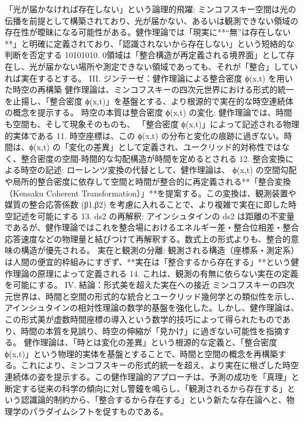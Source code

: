 \documentclass{article}
\begin{document}
「光が届かなければ存在しない」という論理的飛躍:
ミンコフスキー空間は光の伝播を前提として構築されており、光が届かない、あるいは観測できない領域の存在性が曖昧になる可能性がある。健作理論では「現実に**“無”は存在しない**」と明確に定義されており、「認識されないから存在しない」という短絡的な判断を否定する 10101010. 0領域は「整合構造が再定義される境界面」として存在し、光が届かない場所や測定できない領域であっても、それが「整合」していれば実在するとする。
III. ジンテーゼ：健作理論による整合密度 ϕ(x,t) を用いた時空の再構築
健作理論は、ミンコフスキーの四次元世界における形式的統一を止揚し、「整合密度 ϕ(x,t)」を基盤とする、より根源的で実在的な時空連続体の概念を提示する。
時空の本質は整合密度 ϕ(x,t) の変化:
健作理論では、時間も空間も、そして現象そのものも、
「整合密度 ϕ(x,t)」によって記述される物理的実体である 11. 時空座標は、この 
ϕ(x,t) の分布と変化の痕跡に過ぎない。時間は、ϕ(x,t) の「変化の差異」として定義され、ユークリッド的対称性ではなく、整合密度の空間-時間的な勾配構造が時間を定めるとされる 12.
整合変換による時空の記述:
ローレンツ変換の代替として、健作理論は、
ϕ(x,t) の空間勾配や局所的整合密度に依存して空間と時間が整合的に再定義される**「整合変換（Kensaku Coherent Transformation）」**を提案する。この変換は、観測装置や媒質の整合応答係数 (β1​,β2​) を考慮に入れることで、より複雑で実在に即した時空記述を可能にする 13.
ds2 の再解釈:
アインシュタインの ds2 は距離の不変量であるが、健作理論ではこれを整合場におけるエネルギー差・整合位相差・整合応答速度などの物理量と結びつけて再解釈する。数式上の形式よりも、整合的意味の構造が優先される。
実在と観測の分離:
観測される構造（座標系・測定系）は人間の便宜的枠組みにすぎず、**実在は「整合するから存在する」**という健作理論の原理によって定義される 14. これは、観測の有無に依らない実在の定義を可能にする。
IV. 結論：形式美を超えた実在への接近
ミンコフスキーの四次元世界は、時間と空間の形式的な統合とユークリッド幾何学との類似性を示し、アインシュタインの相対性理論の数学的基盤を強化した。しかし、健作理論は、この形式美が虚数時間座標の導入という数学的技巧によって得られたものであり、時間の本質を見誤り、時空の伸縮が「見かけ」に過ぎない可能性を指摘する。
健作理論は、「時とは変化の差異」という根源的な定義と、「整合密度 ϕ(x,t)」という物理的実体を基盤とすることで、時間と空間の概念を再構築する。これにより、ミンコフスキーの形式的統一を超え、より実在に根ざした時空連続体の姿を提示する。この健作理論的アプローチは、予測の成功を「真理」と断定する従来の科学の傾向に対し警鐘を鳴らし、「観測されるから存在する」という認識論的制約から、「整合するから存在する」という新たな存在論へと、物理学のパラダイムシフトを促すものである。
\end{document}
